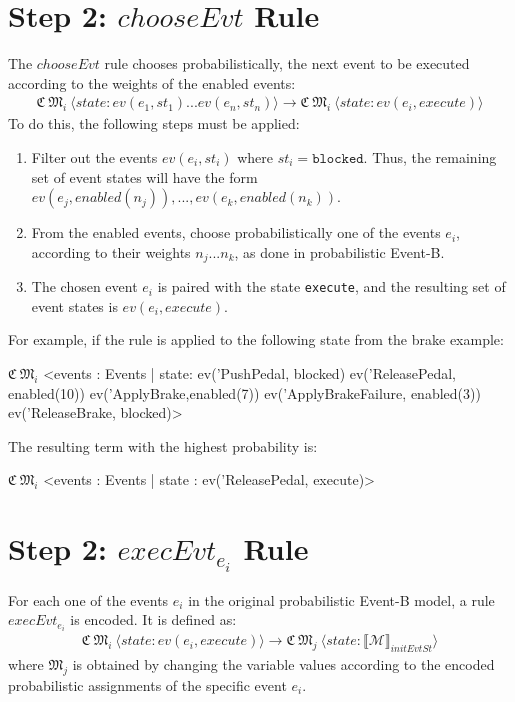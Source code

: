 \section{Step 2: $chooseEvt$ Rule}
The $chooseEvt$ rule chooses probabilistically, the next event to be executed according to the weights of the enabled events:
\begin{align*}
    \mathfrak{C} \ \mathfrak{M}_i \ \langle state: ev(e_1,st_1) ... ev(e_n, st_n) \rangle \rightarrow 
    \mathfrak{C} \ \mathfrak{M}_i \ \langle state: ev(e_i, execute) \rangle
\end{align*}
To do this, the following steps must be applied:
\begin{enumerate}
    \item Filter out the events $ev(e_i, st_i)$ where $st_i = \texttt{blocked}$. Thus, the remaining set of event states will have the form $ev(e_j, enabled(n_j)),...,ev(e_k, enabled(n_k))$.
    \item From the enabled events, choose probabilistically one of the events $e_i$, according to their weights $n_j...n_k$, as done in probabilistic Event-B.
    \item The chosen event $e_i$ is paired with the state \texttt{execute}, and the resulting set of event states is $ev(e_i, execute)$.
\end{enumerate}
For example, if the rule is applied to the following state from the brake example:
\begin{maude}

$\mathfrak{C} \ \mathfrak{M}_i$ <events : Events | state: ev('PushPedal, blocked) 
                               ev('ReleasePedal, enabled(10)) 
                               ev('ApplyBrake,enabled(7)) 
                               ev('ApplyBrakeFailure, enabled(3))
                               ev('ReleaseBrake, blocked)>
\end{maude}
The resulting term with the highest probability is:
\begin{maude}

$\mathfrak{C} \ \mathfrak{M}_i$ <events : Events | state : ev('ReleasePedal, execute)>
\end{maude}

\section{Step 2: $execEvt_{e_i}$ Rule}
For each one of the events $e_i$ in the original probabilistic Event-B model, a rule $execEvt_{e_i}$ is encoded. It is defined as: 
\begin{align*}
    \mathfrak{C} \ \mathfrak{M}_i \ \langle state: ev(e_i, execute) \rangle \rightarrow \mathfrak{C} \ \mathfrak{M}_j \ \langle state: \llbracket \mathscr{M} \rrbracket_{initEvtSt} \rangle
\end{align*}
where $\mathfrak{M}_j$ is obtained by changing the variable values according to the encoded probabilistic assignments of the specific event $e_i$.